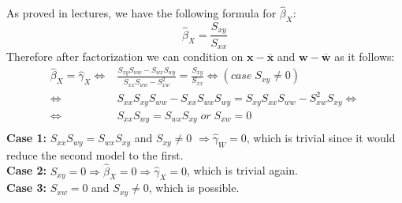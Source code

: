 \documentclass[a4paper]{article}
\begin{document}
As proved in lectures, we have the following formula for $\hat{\beta}_{X}$:
\begin{equation*}
	\hat{\beta}_{X} = \frac{S_{xy}}{S_{xx}}
\end{equation*}
Therefore after factorization we can condition on $\textbf{x}-\overline{\textbf{x}}$ and $\textbf{w}-\overline{\textbf{w}}$ as it follows:
\begin{equation*}
\begin{split}
	\hat{\beta}_{X} = \hat{\gamma}_{X} \Leftrightarrow & \frac{S_{xy}S_{ww} - S_{wx}S_{wy}}{S_{xx}S_{ww}-S_{xw}^2} = \frac{S_{xy}}{S_{xx}}  \Leftrightarrow (case \; S_{xy}\neq0) \\
	\Leftrightarrow & S_{xx}S_{xy}S_{ww}-S_{xx}S_{wx}S_{wy} = S_{xy}S_{xx}S_{ww} - S_{xw}^2S_{xy} \Leftrightarrow \\
	\Leftrightarrow & S_{xx}S_{wy}=S_{wx}S_{xy} \; or \; S_{xw}=0 \\
\end{split}
\end{equation*}
\textbf{Case 1:} $S_{xx}S_{wy}=S_{wx}S_{xy}$ and $S_{xy}\neq0$ $\Rightarrow \hat{\gamma}_{W}=0$, which is trivial since it would reduce the second model to the first.\\
\textbf{Case 2:} $S_{xy} = 0 \Rightarrow \hat{\beta}_{X}=0 \Rightarrow \hat{\gamma}_{X}=0$, which is trivial again.  \\
\textbf{Case 3:} $S_{xw} = 0$ and $S_{xy}\neq0$, which is possible.
\end{document}
